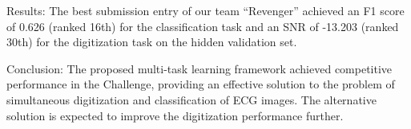 \documentclass{cinc-abstract}
\newcommand\wordcount{ \currfilepath"}}
\begin{document}
Results: The best submission entry of our team ``Revenger'' achieved an F1 score of 0.626 (ranked 16th) for the classification task and an SNR of -13.203 (ranked 30th) for the digitization task on the hidden validation set.

Conclusion: The proposed multi-task learning framework achieved competitive performance in the Challenge, providing an effective solution to the problem of simultaneous digitization and classification of ECG images. The alternative solution is expected to improve the digitization performance further.


\end{document}
